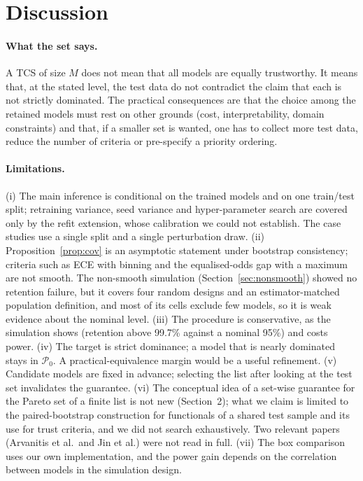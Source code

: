 \documentclass[11pt,a4paper]{article}
\begin{document}
\section{Discussion}\label{sec:disc}
\paragraph{What the set says.} A TCS of size $M$ does not mean that all models are equally trustworthy. It means that, at the stated level, the test data do not contradict the claim that each is not strictly dominated. The practical consequences are that the choice among the retained models must rest on other grounds (cost, interpretability, domain constraints) and that, if a smaller set is wanted, one has to collect more test data, reduce the number of criteria or pre-specify a priority ordering.

\paragraph{Limitations.} (i) The main inference is conditional on the trained models and on one train/test split; retraining variance, seed variance and hyper-parameter search \citep{bouthillier2021,damour2022} are covered only by the refit extension, whose calibration we could not establish. The case studies use a single split and a single perturbation draw. (ii) Proposition~\ref{prop:cov} is an asymptotic statement under bootstrap consistency; criteria such as ECE with binning and the equalised-odds gap with a maximum are not smooth. The non-smooth simulation (Section~\ref{sec:nonsmooth}) showed no retention failure, but it covers four random designs and an estimator-matched population definition, and most of its cells exclude few models, so it is weak evidence about the nominal level. (iii) The procedure is conservative, as the simulation shows (retention above 99.7\% against a nominal 95\%) and costs power. (iv) The target is strict dominance; a model that is nearly dominated stays in $\mathcal{P}_0$. A practical-equivalence margin would be a useful refinement. (v) Candidate models are fixed in advance; selecting the list after looking at the test set invalidates the guarantee. (vi) The conceptual idea of a set-wise guarantee for the Pareto set of a finite list is not new (Section~2); what we claim is limited to the paired-bootstrap construction for functionals of a shared test sample and its use for trust criteria, and we did not search exhaustively. Two relevant papers (Arvanitis et al.\ and Jin et al.) were not read in full. (vii) The box comparison uses our own implementation, and the power gain depends on the correlation between models in the simulation design.
\end{document}
